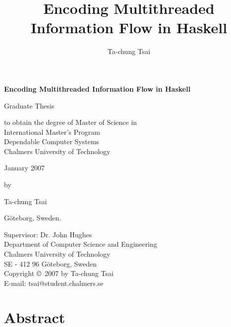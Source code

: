 \documentclass[a4paper]{report}
\title{Encoding Multithreaded Information Flow in Haskell}
\author{Ta-chung Tsai}
\newcommand{\myTitle}{Encoding Multithreaded Information Flow in Haskell}
\newcommand{\mySubtitle}{}
\newcommand{\myAuthor}{Ta-chung Tsai}
\begin{document}
\pagestyle{plain}

\thispagestyle{empty}

\clearpage
\par\vskip 2cm
\begin{center}
{\Huge\bf \myTitle                                         %
\vskip 1cm \Large \mySubtitle                              }           %
\par\vspace {6cm}
{\large Graduate Thesis }
\par\vspace {1cm}
{\large to obtain the degree of Master of Science in \\
International Master's Program \\
Dependable Computer Systems \\
Chalmers University of Technology  }
\par \vspace{1cm}
{\large January 2007  }            %
\par\vspace {1cm} {\large by}
\par \vspace {1cm}
{\Large \myAuthor            }                                  %
\par\vspace {1cm}
{\large G\"{o}teborg, Sweden.}                 %
\end{center}

\clearpage

\thispagestyle{empty}
\noindent
Supervisor: Dr. John Hughes \\
Department of Computer Science and Engineering \\
Chalmers University of Technology \\
SE - 412 96 G\"{o}teborg, Sweden \\

\vfill\noindent
Copyright \copyright\ 2007 by \myAuthor \\
E-mail: tsai@student.chalmers.se

\clearpage

\tableofcontents

\listoffigures
{}

\listoftables
{}

\chapter*{Abstract}
\end{document}
